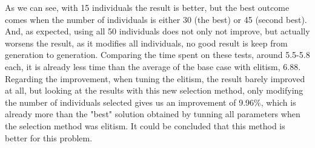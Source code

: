 As we can see, with 15 individuals the result is better, but the best outcome
comes when the number of individuals is either 30 (the best) or 45 (second
best). And, as expected, using all 50 individuals does not only not improve,
but actually worsens the result, as it modifies all individuals, no good
result is keep from generation to generation. Comparing the time spent on these
tests, around 5.5-5.8 each, it is already less time than the average of the base
case with elitism, 6.88. 
Regarding the improvement, when tuning the elitism, the result barely improved
at all, but looking at the results with this new selection method, only
modifying the number of individuals selected gives us an improvement of 9.96\%,
which is already more than the "best" solution obtained by tunning all
parameters when the selection method was elitism. It could be concluded
that this method is better for this problem.\\ 


